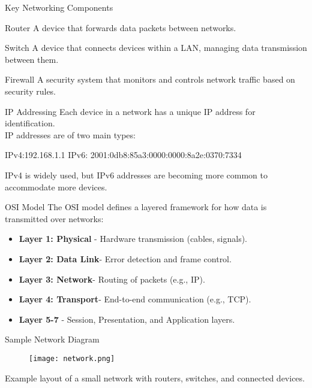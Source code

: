 \documentclass[11pt]{beamer}
\begin{document}
	\begin{frame}
		{Key Networking Components}
		\begin{block}{Router}
			A device that forwards data packets between networks.
		\end{block}
		\begin{block}{Switch}
			A device that connects devices within a LAN, managing data
			transmission between them.
		\end{block}	\begin{block}{Firewall}
			A security system that monitors and controls network traffic based
			on security rules.
		\end{block}
	\end{frame}
	
	\begin{frame}{IP Addressing}
		Each device in a network has a unique IP address for identification. \\
		IP addresses are of two main types:
		
		\vspace{0.5cm}
		
		IPv4:192.168.1.1 IPv6: 2001:0db8:85a3:0000:0000:8a2e:0370:7334
		
		\vspace{0.5cm}
		
		IPv4 is widely used, but IPv6 addresses are becoming more common to accommodate more devices.
	\end{frame}
	\begin{frame}
		{OSI Model}
		The OSI model defines a layered framework for how data is
		transmitted over networks:
		\begin{itemize}
			\item \textbf{Layer 1: Physical} - Hardware transmission (cables, signals).
			\item \textbf{Layer 2: Data Link}- Error detection and frame control.
			\item \textbf{Layer 3: Network}- Routing of packets (e.g., IP).
			\item \textbf{Layer 4: Transport}- End-to-end communication (e.g.,
			TCP).
			\item \textbf{Layer 5-7} - Session, Presentation, and Application layers.
		\end{itemize}
	\end{frame}
	\begin{frame}
		{Sample Network Diagram}
		\begin{figure}
			\centering
			\texttt{[image: network.png]}
		\end{figure}
		\begin{center}
			Example layout of a small network with routers, switches, and
			connected devices.
		\end{center}
		
	\end{frame}
\end{document}
